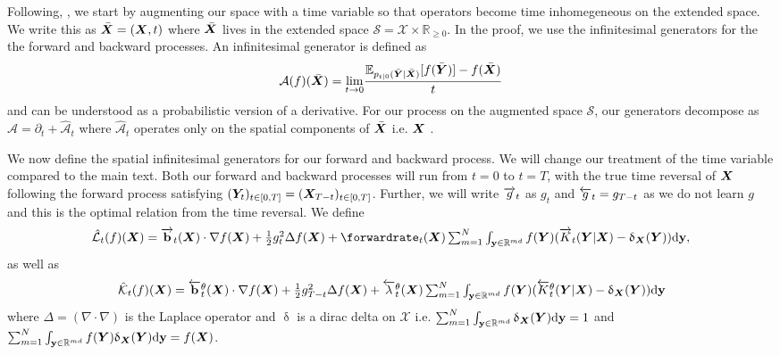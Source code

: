 Following, \cite{benton2022denoising}, we start by augmenting our space with a time variable so that operators become time inhomegeneous on the extended space. We write this as $\bar{{\bm{X}}} = ({\bm{X}}, t)$ where $\bar{{\bm{X}}}$ lives in the extended space $\mathcal{S} = \mathcal{X} \times \mathbb{R}_{\geq 0}$. In the proof, we use the infinitesimal generators for the the forward and backward processes. An infinitesimal generator is defined as 
\begin{equation}
    \mathcal{A}(f)(\bar{{\bm{X}}}) = \underset{t \rightarrow 0}{\text{lim}} \frac{\mathbb{E}_{p_{t|0}(\bar{{\bm{Y}}} | \bar{{\bm{X}}})} [ f(\bar{{\bm{Y}}}) ] - f(\bar{{\bm{X}}}) }{t}
\end{equation}
and can be understood as a probabilistic version of a derivative. For our process on the augmented space $\mathcal{S}$, our generators decompose as $\mathcal{A} = \partial_t + \hat{\mathcal{A}}_t$ where $\hat{\mathcal{A}}_t$ operates only on the spatial components of $\bar{{\bm{X}}}$ i.e. ${\bm{X}}$ \cite{benton2022denoising}.


We now define the spatial infinitesimal generators for our forward and backward process. We will change our treatment of the time variable compared to the main text. Both our forward and backward processes will run from $t=0$ to $t=T$, with the true time reversal of ${\bm{X}}$ following the forward process satisfying $( {\bm{Y}}_t)_{t \in [0, T]} = ({\bm{X}}_{T-t})_{t \in [0, T]}$. Further, we will write $\overrightarrow{g}_t$ as $g_t$ and $\overleftarrow{g}_t = g_{T-t}$ as we do not learn $g$ and this is the optimal relation from the time reversal. We define
\begin{equation}
\textstyle    \hat{\mathcal{L}}_t(f)(\mX) = \forwarddrift_t(\mX) \cdot \nabla f(\mX) + \frac{1}{2} g_t^2 \Delta f (\mX) + \forwardrate_t(\mX) \inty f(\mY) ( \ftk_t( \mY | \mX) - \updelta_{\mX}(\mY) ) \rmd\y ,
\end{equation}
as well as 
\begin{equation}
    \textstyle \hat{\mathcal{K}}_t(f)({\bm{X}}) = \overleftarrow{\mathbf{b}}_t^\theta({\bm{X}}) \cdot \nabla f({\bm{X}}) + \frac{1}{2} g_{T-t}^2 \Delta f ({\bm{X}}) + \overleftarrow{\lambda}_t^\theta({\bm{X}}) \sum_{m=1}^N \int_{\mathbf{y} \in \mathbb{R}^{md}} f({\bm{Y}}) ( \overleftarrow{K}_t^\theta({\bm{Y}} | {\bm{X}}) - \updelta_{{\bm{X}}}({\bm{Y}}) ) \mathrm{d}\mathbf{y} 
\end{equation}
where $\Delta = (\nabla \cdot \nabla)$ is the Laplace operator and $\updelta$ is a dirac delta on $\mathcal{X}$ i.e. $\sum_{m=1}^N \int_{\mathbf{y} \in \mathbb{R}^{md}} \updelta_{{\bm{X}}}({\bm{Y}}) \mathrm{d} \mathbf{y} = 1$ and $\sum_{m=1}^N \int_{\mathbf{y} \in \mathbb{R}^{md}} f({\bm{Y}}) \updelta_{{\bm{X}}} ({\bm{Y}}) \mathrm{d} \mathbf{y} = f({\bm{X}})$. 


